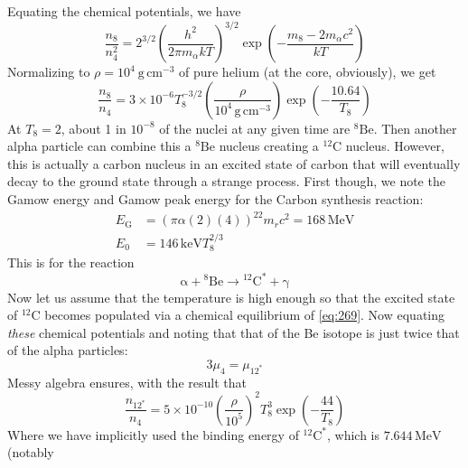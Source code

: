 \documentclass[10pt]{article}
\numberwithin{equation}{section}
\newcommand{\n}{\noindent}
\begin{document}
    \n Equating the chemical potentials, we have
    \begin{equation}
      \label{eq:266}
      \frac{n_8}{n_4^2}=2^{3/2}\left(\frac{h^2}{2\pi m_\alpha
          kT}\right)^{3/2}\exp\left(-\frac{m_8-2m_\alpha c^2}{kT}\right)
    \end{equation}
    Normalizing to $\rho=10^4\ \mathrm{g\,cm^{-3}}$ of pure helium (at
    the core, obviously), we get
    \begin{equation}
      \label{eq:267}
      \frac{n_8}{n_4}=3\times
      10^{-6}T_8^{-3/2}\left(\frac{\rho}{10^4\,\mathrm{g\,cm^{-3}}}\right)
\exp\left(-\frac{10.64}{T_8}\right) 
    \end{equation}
    At $T_8=2$, about 1 in $10^{-8}$ of the nuclei at any given time
    are ${}^8\mathrm{Be}$. Then another alpha particle can combine
    this a ${}^8\mathrm{Be}$ nucleus creating a ${}^{12}\mathrm{C}$
    nucleus. However, this is actually a carbon nucleus in an excited
    state of carbon that will eventually decay to the ground state
    through a strange process. First though, we note the Gamow energy
    and Gamow peak energy for the Carbon synthesis reaction:
    \begin{align}
      \label{eq:268}
      E_\mathrm{G}&=\left(\pi\alpha(2)(4)\right)^22m_rc^2=168\,\mathrm{MeV}
\\
      \label{eq:268a}
      E_0&=146\,\mathrm{keV}T_8^{2/3}
    \end{align}
    This is for the reaction
    \begin{equation}
      \label{eq:269}
      \mathrm{\alpha+{}^8Be\to{}^{12}C^*+\gamma}
    \end{equation}
    Now let us assume that the temperature is high enough so that the
    excited state of ${}^{12}\mathrm{C}$ becomes populated via a
    chemical equilibrium of \eqref{eq:269}. Now equating
    \textit{these} chemical potentials and noting that that of the Be
    isotope is just twice that of the alpha particles:
    \begin{equation}
      \label{eq:270}
      3\mu_4=\mu_{12^*}
    \end{equation}
    Messy algebra ensures, with the result that
    \begin{equation}
      \label{eq:271}
      \frac{n_{\mathrm{12^*}}}{n_4}=5\times
      10^{-10}\left(\frac{\rho}{10^5}\right)^2T_8^3\exp\left(-\frac{44}
{T_8}\right)
    \end{equation}
    Where we have implicitly used the binding energy of
    ${}^{12}\mathrm{C}^*$, which is $7.644\,\mathrm{MeV}$ (notably
\end{document}
